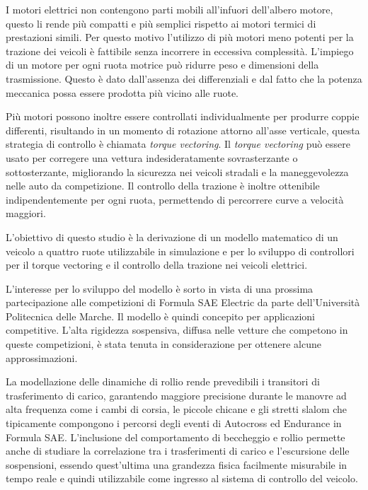 \sommarioITA
I motori elettrici non contengono parti mobili all'infuori dell'albero motore, questo li rende più compatti e più semplici rispetto ai motori termici di prestazioni simili. Per questo motivo l'utilizzo di più motori meno potenti per la trazione dei veicoli è fattibile senza incorrere in eccessiva complessità.
L'impiego di un motore per ogni ruota motrice può ridurre peso e dimensioni della trasmissione. Questo è dato dall'assenza dei differenziali e dal fatto che la potenza meccanica possa essere prodotta più vicino alle ruote.

Più motori possono inoltre essere controllati individualmente per produrre coppie differenti, risultando in un momento di rotazione attorno all'asse verticale, questa strategia di controllo è chiamata \textit{torque vectoring}.
Il \textit{torque vectoring} può essere usato per corregere una vettura indesideratamente sovrasterzante o sottosterzante, migliorando la sicurezza nei veicoli stradali e la maneggevolezza nelle auto da competizione.
Il controllo della trazione è inoltre ottenibile indipendentemente per ogni ruota, permettendo di percorrere curve a velocità maggiori.

L'obiettivo di questo studio è la derivazione di un modello matematico di un veicolo a quattro ruote utilizzabile in simulazione e per lo sviluppo di controllori per il torque vectoring e il controllo della trazione nei veicoli elettrici.

L'interesse per lo sviluppo del modello è sorto in vista di una prossima partecipazione alle competizioni di Formula SAE Electric da parte dell'Università Politecnica delle Marche. Il modello è quindi concepito per applicazioni competitive. L'alta rigidezza sospensiva, diffusa nelle vetture che competono in queste competizioni, è stata tenuta in considerazione per ottenere alcune approssimazioni.

La modellazione delle dinamiche di rollio rende prevedibili i transitori di trasferimento di carico, garantendo maggiore precisione durante le manovre ad alta frequenza come i cambi di corsia, le piccole chicane e gli stretti slalom che tipicamente compongono i percorsi degli eventi di Autocross ed Endurance in Formula SAE.
L'inclusione del comportamento di beccheggio e rollio permette anche di studiare la correlazione tra i trasferimenti di carico e l'escursione delle sospensioni, essendo quest'ultima una grandezza fisica facilmente misurabile in tempo reale e quindi utilizzabile come ingresso al sistema di controllo del veicolo.

